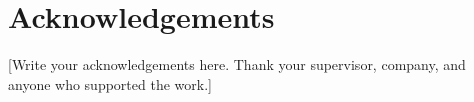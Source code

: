 \chapter*{Acknowledgements}

[Write your acknowledgements here. Thank your supervisor, company, and anyone who
supported the work.]

\newpage
